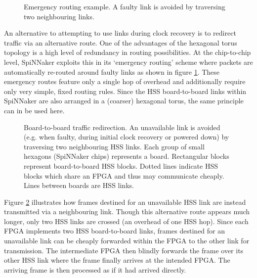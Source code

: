 			\begin{figure}
				\center
				
				
				\caption[Emergency routing example.]{Emergency routing example. A
				faulty link is avoided by traversing two neighbouring links.}
				\label{fig:emergency-routing}
			\end{figure}
			
			An alternative to attempting to use links during clock recovery is to
			redirect traffic via an alternative route. One of the advantages of the
			hexagonal torus topology is a high level of redundancy in routing
			possibilities.  At the chip-to-chip level, SpiNNaker exploits this in its
			`emergency routing' scheme where packets are automatically re-routed
			around faulty links as shown in figure \ref{fig:emergency-routing}. These
			emergency routes feature only a single hop of overhead and additionally
			require only very simple, fixed routing rules. Since the HSS
			board-to-board links within SpiNNaker are also arranged in a (coarser)
			hexagonal torus, the same principle can in be used here.
			
			\begin{figure}
				\center
				
				
				\caption[Board-to-board traffic redirection.]{Board-to-board traffic
				redirection. An unavailable link is avoided (e.g. when faulty, during
				initial clock recovery or powered down) by traversing two neighbouring
				HSS links. Each group of small hexagons (SpiNNaker chips) represents a
				board. Rectangular blocks represent board-to-board HSS blocks. Dotted
				lines indicate HSS blocks which share an FPGA and thus may communicate
				cheaply. Lines between boards are HSS links.}
				\label{fig:board-to-board-redirection}
				\end{figure}
			
			Figure \ref{fig:board-to-board-redirection} illustrates how frames
			destined for an unavailable HSS link are instead transmitted via a
			neighbouring link.  Though this alternative route appears much longer,
			only two HSS links are crossed (an overhead of one HSS hop). Since each
			FPGA implements two HSS board-to-board links, frames destined for an
			unavailable link can be cheaply forwarded within the FPGA to the other
			link for transmission. The intermediate FPGA then blindly forwards the
			frame over its other HSS link where the frame finally arrives at the
			intended FPGA. The arriving frame is then processed as if it had arrived
			directly.
			

